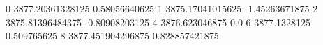 0 3877.20361328125 0.58056640625
1 3875.17041015625 -1.45263671875
2 3875.81396484375 -0.80908203125
4 3876.623046875 0.0
6 3877.1328125 0.509765625
8 3877.451904296875 0.828857421875
